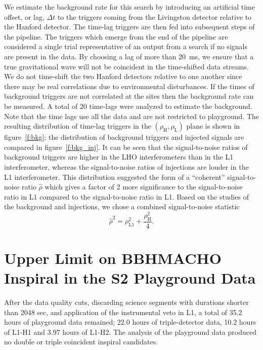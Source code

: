 We estimate the background rate for this search by introducing an artificial
time offset, or {lag}, $\Delta t$ to the triggers coming from the Livingston
detector relative to the Hanford detector.  The time-lag triggers are then fed
into subsequent steps of the pipeline.  The triggers which emerge from the end
of the pipeline are considered a single trial representative of an output from
a search if no signals are present in the data.   By choosing a lag of more
than 20~ms, we ensure that a true gravitational wave will not be coincident in
the time-shifted data streams.  We do not time-shift the two Hanford detectors
relative to one another since there may be real correlations due to
environmental disturbances.  If the times of background triggers are not
correlated at the sites then the background rate can be measured. A total of
20 time-lags were analyzed to estimate the background. Note that the time lags
use all the data and are not restricted to playground. The resulting
distribution of time-lag triggers in the
$(\rho_{\mathrm{H}},\rho_{\mathrm{L}})$ plane is shown in figure~\ref{f:bkg};
the distribution of background triggers and injected signals are compared in
figure~\ref{f:bkg_inj}. It can be seen that the signal-to-noise ratios of
background triggers are higher in the LHO interferometers than in the L1
interferometer, whereas the signal-to-noise ratios of injections are louder in the
L1 interferometer. This distribution suggested the form of a ``coherent''
signal-to-noise ratio $\hat{\rho}$ which gives a factor of 2 more significance
to the signal-to-noise ratio in L1 compared to the signal-to-noise ratio in
L1. Based on the studies of the background and injections, we chose a
combined signal-to-noise statistic
\begin{equation}
\hat{\rho}^2 = \rho^2_{\mathrm{L1}} +  \frac{\rho_{\mathrm{H}}^2 }{ 4 }.
\label{eq:combinedsnr}
\end{equation}

\section{Upper Limit on BBHMACHO Inspiral in the S2 Playground Data}
\label{s:s2upperlimit}

After the data quality cuts, discarding science segments with durations
shorter than 2048 sec, and application of the instrumental veto in L1, a
total of {35.2} hours of playground data remained; {22.0} hours of
triple-detector data,  {10.2} hours of L1-H1 and {3.97} hours of L1-H2. The
analysis of the playground data produced no double or triple coincident
inspiral candidates.

